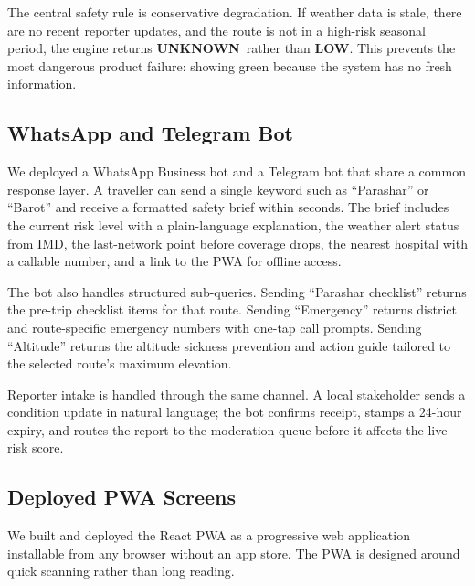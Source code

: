 \documentclass[12pt,a4paper]{article}
\newcommand{\risklow}{\cellcolor{lightgreen}\textbf{LOW}}
\newcommand{\riskunknown}{\cellcolor{lightgray}\textbf{UNKNOWN}}
\begin{document}
The central safety rule is conservative degradation. If weather data is stale, there are no recent reporter updates, and the route is not in a high-risk seasonal period, the engine returns \riskunknown\ rather than \risklow. This prevents the most dangerous product failure: showing green because the system has no fresh information.

\subsection{WhatsApp and Telegram Bot}

We deployed a WhatsApp Business bot and a Telegram bot that share a common response layer. A traveller can send a single keyword such as ``Parashar'' or ``Barot'' and receive a formatted safety brief within seconds. The brief includes the current risk level with a plain-language explanation, the weather alert status from IMD, the last-network point before coverage drops, the nearest hospital with a callable number, and a link to the PWA for offline access.

The bot also handles structured sub-queries. Sending ``Parashar checklist'' returns the pre-trip checklist items for that route. Sending ``Emergency'' returns district and route-specific emergency numbers with one-tap call prompts. Sending ``Altitude'' returns the altitude sickness prevention and action guide tailored to the selected route's maximum elevation.

Reporter intake is handled through the same channel. A local stakeholder sends a condition update in natural language; the bot confirms receipt, stamps a 24-hour expiry, and routes the report to the moderation queue before it affects the live risk score.

\subsection{Deployed PWA Screens}

We built and deployed the React PWA as a progressive web application installable from any browser without an app store. The PWA is designed around quick scanning rather than long reading.
\end{document}
